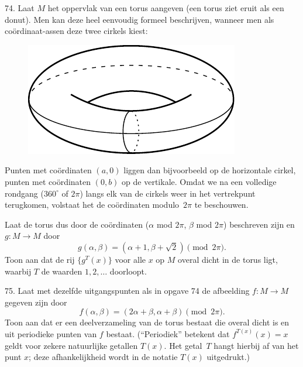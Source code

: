 \begin{problem}{74.}
	Laat $M$ het oppervlak van een torus aangeven (een torus ziet eruit als een donut). Men kan deze heel eenvoudig formeel beschrijven, wanneer men als coördinaat-assen deze twee cirkels kiest:
	\begin{figure}
		\includegraphics{resources/74_torus}
	\end{figure}

	Punten met coördinaten $(a,0)$ liggen dan bijvoorbeeld op de hori\-zontale cirkel, punten met coördinaten $(0,b)$ op de vertikale. Omdat we na een volledige rondgang ($360^\circ$ of $2\pi$) langs elk van de cirkels weer in het vertrekpunt terugkomen, volstaat het de coördinaten modulo~$2\pi$ te beschouwen.

	Laat de torus dus door de coördinaten ($\alpha$ mod $2\pi$, $\beta$ mod $2\pi$) beschreven zijn en $g: M\to M$ door
	\begin{equation*}
		g(\alpha, \beta)=(\alpha+1, \beta+\sqrt{2}) \pmod {2\pi}.
	\end{equation*}
	Toon aan dat de rij $\{g^T (x)\}$ voor alle $x$ op $M$ overal dicht in de torus ligt, waarbij $T$ de waarden $1,2,\dots$ doorloopt.
\end{problem}

\clearpage

\begin{problem}{75.}
	Laat met dezelfde uitgangspunten als in opgave 74 de afbeelding $f: M\to M$ gegeven zijn door
	\begin{equation*}
		f(\alpha, \beta)=(2\alpha+\beta, \alpha+\beta) \pmod {2\pi}.
	\end{equation*}
	Toon aan dat er een deelverzameling van de torus bestaat die overal dicht is en uit periodieke punten van $f$ bestaat. (\enquote{Periodiek} betekent dat $f^{T (x)} (x)=x$ geldt voor zekere natuurlijke getallen $T(x)$. Het getal~$T$ hangt hierbij af van het punt $x$; deze afhankelijkheid wordt in de notatie $T(x)$ uitgedrukt.)
\end{problem}

